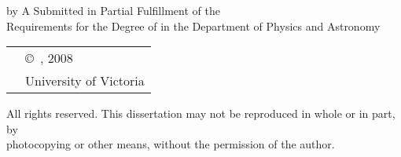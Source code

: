 
\pagebreak
{
	\centering
	\thesistitle
	\tpbreak
	by
	\tpbreak
	\nameanddegrees
	\tpbreak
	A \PhDorMas Submitted in Partial Fulfillment of the \\
	Requirements for the Degree of
	\tpbreak
	\PhDorMaster
	\tpbreak
	in the Department of Physics and Astronomy\\
	\vfill
	\begin{tabular}{cl}
		& \copyright\ \yourname, 2008\\
		& \phantom{\copyright} University of Victoria
	\end{tabular}
	\tpbreak
	All rights reserved. This dissertation may not be reproduced in whole or in part, by \\
	\hfill photocopying or other means, without the permission of the author. 
	\hfill
}
\pagebreak
